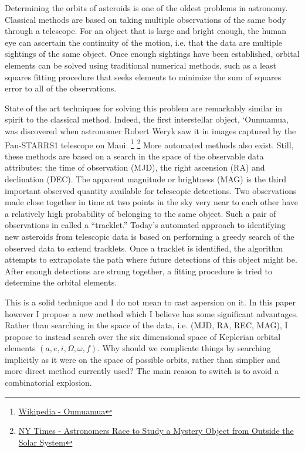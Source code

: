 Determining the orbits of asteroids is one of the oldest problems in astronomy.
Classical methods are based on taking multiple observations of the same body through a telescope.
For an object that is large and bright enough, the human eye can ascertain the continuity of the motion,
i.e. that the data are multiple sightings of the same object.
Once enough sightings have been established, orbital elements can be solved using traditional
numerical methods, such as a least squares fitting procedure that seeks elements to minimize
the sum of squares error to all of the observations.

State of the art techniques for solving this problem are remarkably similar in spirit to the classical method.
Indeed, the first interstellar object, `Oumuamua, was discovered when astronomer Robert Weryk
saw it in images captured by the Pan-STARRS1 telescope on Maui.
\footnote{\href{https://en.wikipedia.org/wiki/\%CA\%BBOumuamua}{Wikipedia - Oumuamua}}
\footnote{\href{https://www.nytimes.com/2017/10/27/science/interstellar-object-solar-system.html}{NY Times - Astronomers Race to Study a Mystery Object from Outside the Solar System}}
More automated methods also exist.
Still, these methods are based on a search in the space of the observable data attributes: the time of observation (MJD), the right ascension (RA) and declination (DEC).
The apparent magnitude or brightness (MAG) is the third important observed quantity available for telescopic detections.
Two observations made close together in time at two points in the sky very near to each other have a relatively high probability of belonging to the same object.
Such a pair of observations in called a ``tracklet.''
Today's automated approach to identifying new asteroids from telescopic data is based on performing a greedy search of the observed data to extend tracklets.
Once a tracklet is identified, the algorithm attempts to extrapolate the path where future detections of this object might be.
After enough detections are strung together, a fitting procedure is tried to determine the orbital elements.

This is a solid technique and I do not mean to cast aspersion on it.
In this paper however I propose a new method which I believe has some significant advantages.
Rather than searching in the space of the data, i.e. (MJD, RA, REC, MAG), I propose to instead search over the six dimensional space of 
Keplerian orbital elements $(a, e, i, \Omega, \omega, f)$.
Why should we complicate things by searching implicitly as it were on the space of possible orbits,
rather than simplier and more direct method currently used?
The main reason to switch is to avoid a combinatorial explosion.

